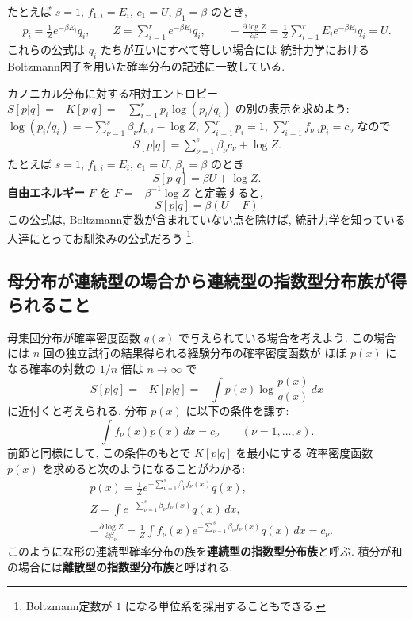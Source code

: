 \documentclass[12pt,twoside]{jarticle}
\renewcommand\d{\partial}
\theoremstyle{definition} %
\theoremstyle{definition} %
\theoremstyle{definition} %
\numberwithin{theorem}{section}
\numberwithin{equation}{section}
\numberwithin{figure}{section}
\numberwithin{table}{section}
\begin{document}
たとえば $s=1$, $f_{1,i}=E_i$, $c_1=U$, $\beta_1=\beta$ のとき, 
\begin{align*}
p_i = \frac{1}{Z}e^{-\beta E_i}q_i,
\qquad
Z = \sum_{i=1}^r e^{-\beta E_i}q_i,
\qquad
-\frac{\d\log Z}{\d\beta} 
= \frac{1}{Z} \sum_{i=1}^r E_i e^{-\beta E_i}q_i = U.
\end{align*}
これらの公式は $q_i$ たちが互いにすべて等しい場合には
統計力学におけるBoltzmann因子を用いた確率分布の記述に一致している.

カノニカル分布に対する相対エントロピー $S[p|q]=-K[p|q]=-\sum_{i=1}^r p_i\log(p_i/q_i)$
の別の表示を求めよう: 
$\log(p_i/q_i)=-\sum_{\nu=1}^s\beta_\nu f_{\nu,i}-\log Z$, $\sum_{i=1}^r p_i=1$,
$\sum_{i=1}^r f_{\nu,i}p_i=c_\nu$ なので
\begin{align*}
S[p|q] = \sum_{\nu=1}^s \beta_\nu c_\nu + \log Z.
\end{align*}
たとえば $s=1$, $f_{1,i}=E_i$, $c_1=U$, $\beta_1=\beta$ のとき
\[
S[p|q] = \beta U + \log Z.
\]
{\bf 自由エネルギー} $F$ を $F=-\beta^{-1}\log Z$ と定義すると,
\[
S[p|q] = \beta(U-F)
\]
この公式は, Boltzmann定数が含まれていない点を除けば,
統計力学を知っている人達にとってお馴染みの公式だろう%
\footnote{Boltzmann定数が $1$ になる単位系を採用することもできる.}.



\subsection{母分布が連続型の場合から連続型の指数型分布族が得られること}

母集団分布が確率密度函数 $q(x)$ で与えられている場合を考えよう.
この場合には $n$ 回の独立試行の結果得られる経験分布の確率密度函数が
ほぼ $p(x)$ になる確率の対数の $1/n$ 倍は $n\to\infty$ で
\[
S[p|q]=-K[p|q] = -\int p(x)\log\frac{p(x)}{q(x)}\,dx
\]
に近付くと考えられる. 分布 $p(x)$ に以下の条件を課す:
\[
\int f_\nu(x)p(x)\,dx = c_\nu
\qquad (\nu=1,\ldots,s).
\]
前節と同様にして, この条件のもとで $K[p|q]$ を最小にする
確率密度函数 $p(x)$ を求めると次のようになることがわかる:
\begin{align*}
&
p(x)=\frac{1}{Z}e^{-\sum_{\nu=1}^s \beta_\nu f_\nu(x)}q(x), 
\\ &
Z=\int e^{-\sum_{\nu=1}^s \beta_\nu f_\nu(x)}q(x)\,dx,
\\ &
-\frac{\d\log Z}{\d\beta_\nu} 
= \frac{1}{Z}\int f_\nu(x) e^{-\sum_{\nu=1}^s \beta_\nu f_\nu(x)}q(x) \,dx
= c_\nu.
\end{align*}
このようにな形の連続型確率分布の族を{\bf 連続型の指数型分布族}と呼ぶ.
積分が和の場合には{\bf 離散型の指数型分布族}と呼ばれる.
\end{document}
